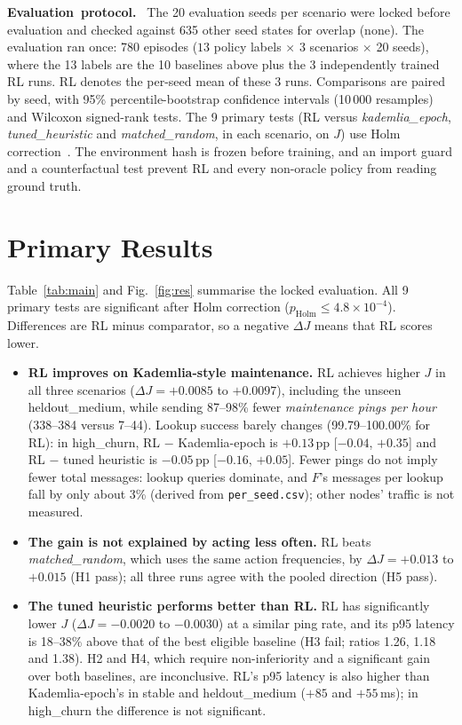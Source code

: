 \documentclass[9pt,twocolumn]{extarticle}
\newcommand{\inl}[1]{\mbox{\textbf{#1.}}\ }
\newcommand{\pol}[1]{\textit{#1}}
\begin{document}
\inl{Evaluation protocol} The 20 evaluation seeds per scenario were locked before evaluation and checked against 635 other seed states for overlap (none). The evaluation ran once: 780 episodes ($13$ policy labels $\times$ 3 scenarios $\times$ 20 seeds), where the 13 labels are the 10 baselines above plus the 3 independently trained RL runs. RL denotes the per-seed mean of these 3 runs. Comparisons are paired by seed, with 95\% percentile-bootstrap confidence intervals (10\,000 resamples) and Wilcoxon signed-rank tests. The 9 primary tests (RL versus \pol{kademlia\_epoch}, \pol{tuned\_heuristic} and \pol{matched\_random}, in each scenario, on $J$) use Holm correction~\cite{holm}. The environment hash is frozen before training, and an import guard and a counterfactual test prevent RL and every non-oracle policy from reading ground truth.


\section{Primary Results}
Table~\ref{tab:main} and Fig.~\ref{fig:res} summarise the locked evaluation. All 9 primary tests are significant after Holm correction ($p_{\mathrm{Holm}}\le 4.8\times10^{-4}$). Differences are RL minus comparator, so a negative $\Delta J$ means that RL scores lower.

\begin{itemize}
\item \textbf{RL improves on Kademlia-style maintenance.} RL achieves higher $J$ in all three scenarios ($\Delta J=+0.0085$ to $+0.0097$), including the unseen heldout\_medium, while sending 87--98\% fewer \emph{maintenance pings per hour} (338--384 versus 7--44). Lookup success barely changes (99.79--100.00\% for RL): in high\_churn, RL $-$ Kademlia-epoch is $+0.13$\,pp [$-0.04$, $+0.35$] and RL $-$ tuned heuristic is $-0.05$\,pp [$-0.16$, $+0.05$]. Fewer pings do not imply fewer total messages: lookup queries dominate, and $F$'s messages per lookup fall by only about 3\% (derived from \texttt{per\_seed.csv}); other nodes' traffic is not measured.
\item \textbf{The gain is not explained by acting less often.} RL beats \pol{matched\_random}, which uses the same action frequencies, by $\Delta J=+0.013$ to $+0.015$ (H1 pass); all three runs agree with the pooled direction (H5 pass).
\item \textbf{The tuned heuristic performs better than RL.} RL has significantly lower $J$ ($\Delta J=-0.0020$ to $-0.0030$) at a similar ping rate, and its p95 latency is 18--38\% above that of the best eligible baseline (H3 fail; ratios 1.26, 1.18 and 1.38). H2 and H4, which require non-inferiority and a significant gain over both baselines, are inconclusive. RL's p95 latency is also higher than Kademlia-epoch's in stable and heldout\_medium ($+85$ and $+55$\,ms); in high\_churn the difference is not significant.
\end{itemize}
\end{document}

